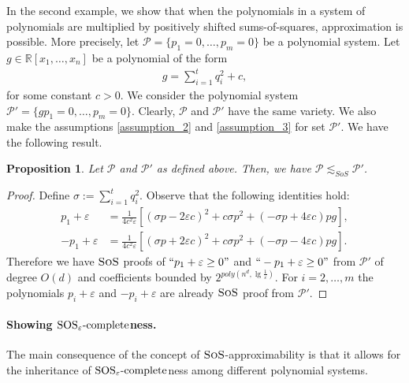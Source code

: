 \documentclass[11pt]{article}
\newcommand{\sos}{\text{\sc{SoS}}}
\newcommand{\1}{\textbf{1}}
\newtheorem{proposition}[theorem]{Proposition}
\newcommand{\SOSe}{\rm{SOS}_\varepsilon\text{-complete}}
\begin{document}
In the second example, we show that when the polynomials in a system of polynomials are multiplied by positively shifted sums-of-squares, approximation is possible. More precisely, let $\mathcal{P}=\{p_1 = 0, \dots, p_m = 0\}$ be a polynomial system. Let $g\in \mathbb{R}[x_1, \dots, x_n]$ be a polynomial of the form
\begin{align}\label{sos+p}
    g = \sum_{i=1}^t q_i^2 + c,
\end{align}
for some constant $c > 0$. We consider the polynomial system $\mathcal{P}'=\{gp_1=0, \dots, p_m=0\}$. Clearly, $\mathcal{P}$ and $\mathcal{P}'$ have the same variety. We also make the assumptions \ref{assumption_2} and \ref{assumption_3} for set $\mathcal{P}'$. We have the following result.
\begin{proposition}
    Let $\mathcal{P}$ and $\mathcal{P}'$ as defined above. Then, we have $\mathcal{P} \lesssim_{SoS} \mathcal{P}'$.
\end{proposition}
\begin{proof}
Define $\sigma := \sum_{i=1}^t q_i^2$. Observe that the following identities hold: 
\begin{align*}
    p_1 + \varepsilon &= \frac{1}{4c^2 \varepsilon} \left[(\sigma p - 2\varepsilon c)^2 + c \sigma p^2 + (-\sigma p + 4\varepsilon c)pg \right], \\
    -p_1 + \varepsilon &= \frac{1}{4c^2 \varepsilon} \left[(\sigma p + 2\varepsilon c)^2 + c \sigma p^2 + (-\sigma p - 4\varepsilon c)pg \right].
\end{align*}
Therefore we have $\sos$ proofs of $``p_1 + \varepsilon \geq 0"$ and $``-p_1 + \varepsilon \geq 0"$ from $\mathcal{P}'$ of degree $O(d)$ and coefficients bounded by $2^{poly(n^d, \lg \frac{1}{\varepsilon})}$. For $i=2, \dots, m$ the polynomials $p_i+\varepsilon$ and $-p_i+\varepsilon$ are already $\sos$ proof from $\mathcal{P}'$.
\end{proof}

\paragraph{Showing $\SOSe$ness.}

The main consequence of the concept of $\sos$-approximability is that it allows for the inheritance of $\SOSe$ness among different polynomial systems.
\end{document}

